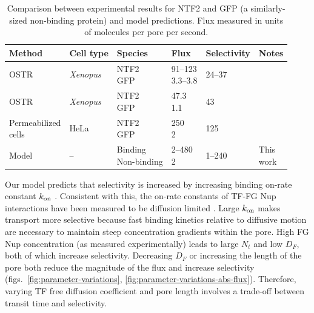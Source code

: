 \begin{table}[b!]
  \caption{Comparison between experimental results for NTF2 and GFP
    (a similarly-sized non-binding protein) and model
    predictions. Flux measured in units of molecules per pore per
    second.}
    \label{table:NTF2-flux}
    \begin{tabular}{p{2.1cm}p{1.2cm}p{1.7cm}p{0.9cm}p{1.6cm}p{0.8cm}}
      Method & Cell type & Species & Flux & Selectivity & Notes\\
      \hline
      OSTR & \textit{Xenopus} & \makecell[cl]{NTF2\\GFP} & \makecell[cl]{91--123\\3.3--3.8} & 24--37 
                         &\cite{siebrasse02}
      \\
      OSTR & \textit{Xenopus} & \makecell[cl]{NTF2\\GFP} & \makecell[cl]{47.3\\1.1} & 43 &  \cite{kiskin03}\\
      \makecell[cl]{Permeabilized \\ cells}  & HeLa &
                                                    \makecell[cl]{NTF2\\GFP} & \makecell[cl]{250\\2} & 125 & \cite{ribbeck01}\\
      Model & -- & \makecell[cl]{Binding\\Non-binding} & \makecell[cl]{2--480\\2} & 1--240 & \makecell[cl]{This\\work}\\
    \end{tabular}
\end{table}

Our model predicts that selectivity is increased by increasing binding
on-rate constant $k_{\rm on}$ . Consistent
with this, the on-rate constants of TF-FG Nup interactions have been
measured to be diffusion limited \cite{milles15, hough15}.  Large
$k_{\rm on}$ makes transport more selective because fast binding kinetics
relative to diffusive motion are necessary to maintain steep
concentration gradients within the pore. High FG Nup concentration (as
measured experimentally) leads to large $N_t$ and low $D_F$, both of
which increase selectivity.  Decreasing $D_F$ or increasing the length
of the pore both reduce the magnitude of the flux and increase
selectivity (figs.~\ref{fig:parameter-variations},
\ref{fig:parameter-variations-abs-flux}). Therefore, varying TF free
diffusion coefficient and pore length involves a trade-off between
transit time and selectivity.


